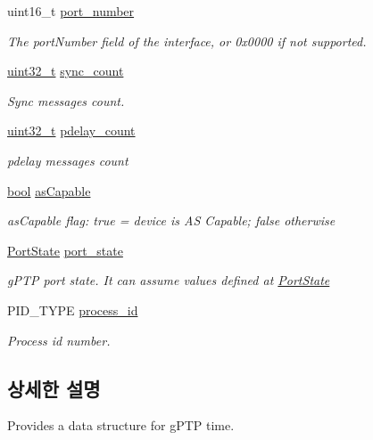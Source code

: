 \begin{DoxyCompactItemize}
uint16\+\_\+t \hyperlink{structg_ptp_time_data_af0afa7bb85d49ac5ff873fad86a48ec5}{port\+\_\+number}
\begin{DoxyCompactList}\small\item\em The port\+Number field of the interface, or 0x0000 if not supported. \end{DoxyCompactList}\item 
\hyperlink{parse_8c_a6eb1e68cc391dd753bc8ce896dbb8315}{uint32\+\_\+t} \hyperlink{structg_ptp_time_data_ab918355ca94ac81d7397800a7ef77c0a}{sync\+\_\+count}
\begin{DoxyCompactList}\small\item\em Sync messages count. \end{DoxyCompactList}\item 
\hyperlink{parse_8c_a6eb1e68cc391dd753bc8ce896dbb8315}{uint32\+\_\+t} \hyperlink{structg_ptp_time_data_a7557e8c3c5a258ba096b5c1c274f17bf}{pdelay\+\_\+count}
\begin{DoxyCompactList}\small\item\em pdelay messages count \end{DoxyCompactList}\item 
\hyperlink{avb__gptp_8h_af6a258d8f3ee5206d682d799316314b1}{bool} \hyperlink{structg_ptp_time_data_a15a09cf240fb37b905e4d4e1e9f5b9a1}{as\+Capable}
\begin{DoxyCompactList}\small\item\em as\+Capable flag\+: true = device is AS Capable; false otherwise \end{DoxyCompactList}\item 
\hyperlink{ptptypes_8hpp_a679431f1afc75d7bb9e972c022e53672}{Port\+State} \hyperlink{structg_ptp_time_data_ae66554126902ed959a3b296ddd3204e8}{port\+\_\+state}
\begin{DoxyCompactList}\small\item\em g\+P\+TP port state. It can assume values defined at \hyperlink{ptptypes_8hpp_a679431f1afc75d7bb9e972c022e53672}{Port\+State} \end{DoxyCompactList}\item 
P\+I\+D\+\_\+\+T\+Y\+PE \hyperlink{structg_ptp_time_data_aa5e5e89995d6bfb4b61b08fa89656812}{process\+\_\+id}
\begin{DoxyCompactList}\small\item\em Process id number. \end{DoxyCompactList}\end{DoxyCompactItemize}


\subsection{상세한 설명}
Provides a data structure for g\+P\+TP time. 

